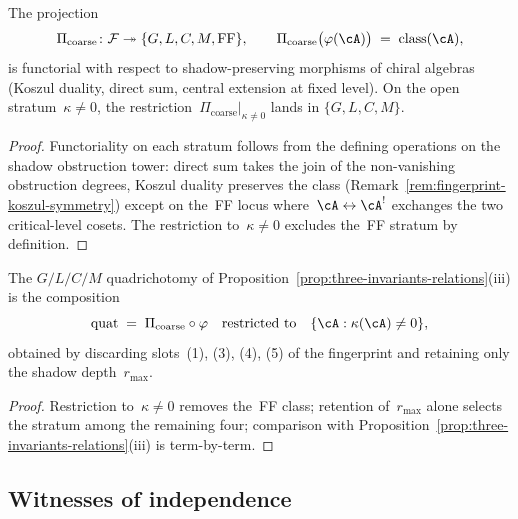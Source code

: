 \begin{proposition}
\label{prop:coarse-projection-functor}
\ClaimStatusProvedHere
The projection
\begin{equation}\label{eq:coarse-projection}
\Pi_{\mathrm{coarse}} \colon \mathcal{F} \twoheadrightarrow \{G, L, C, M, \mathrm{FF}\},
\qquad
\Pi_{\mathrm{coarse}}\bigl(\varphi(\cA)\bigr) \;=\; \mathrm{class}(\cA),
\end{equation}
is functorial with respect to shadow-preserving morphisms of chiral
algebras \textup{(}Koszul duality, direct sum, central extension at
fixed level\textup{)}. On the open stratum~$\kappa \neq 0$, the
restriction~$\Pi_{\mathrm{coarse}}|_{\kappa \neq 0}$ lands in
$\{G, L, C, M\}$.
\end{proposition}

\begin{proof}
Functoriality on each stratum follows from the defining operations on
the shadow obstruction tower: direct sum takes the join of the
non-vanishing obstruction degrees, Koszul
duality preserves the class (Remark~\ref{rem:fingerprint-koszul-symmetry})
except on the~FF locus where~$\cA \leftrightarrow \cA^!$ exchanges
the two critical-level cosets. The restriction to~$\kappa\neq 0$
excludes the~FF stratum by definition.
\end{proof}

\begin{corollary}
\label{cor:quadrichotomy-as-projection}
\ClaimStatusProvedHere
The $G/L/C/M$ quadrichotomy of
Proposition~\textup{\ref{prop:three-invariants-relations}}(iii)
is the composition
\begin{equation}\label{eq:quadrichotomy-composition}
\mathrm{quat} \;=\; \Pi_{\mathrm{coarse}} \circ \varphi
\quad\text{restricted to}\quad \{\cA : \kappa(\cA) \neq 0\},
\end{equation}
obtained by discarding slots~\textup{(1), (3), (4), (5)} of the
fingerprint and retaining only the shadow depth~$r_{\max}$.
\end{corollary}

\begin{proof}
Restriction to~$\kappa \neq 0$ removes the~FF class; retention
of~$r_{\max}$ alone selects the stratum among the remaining four;
comparison with Proposition~\ref{prop:three-invariants-relations}(iii)
is term-by-term.
\end{proof}

\subsection{Witnesses of independence}
\label{ssec:fingerprint-witnesses}

